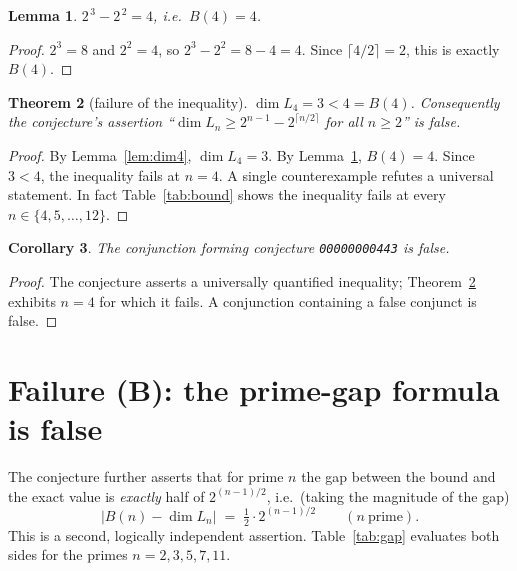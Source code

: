 \documentclass[11pt]{article}
\newtheorem{theorem}{Theorem}
\newtheorem{lemma}[theorem]{Lemma}
\newtheorem{corollary}[theorem]{Corollary}
\theoremstyle{definition}
\theoremstyle{remark}
\begin{document}
\begin{lemma}
\label{lem:b4}
$2^{\,3} - 2^{\,2} = 4$, i.e.\ $B(4) = 4$.
\end{lemma}

\begin{proof}
$2^{3} = 8$ and $2^{2} = 4$, so $2^{3} - 2^{2} = 8 - 4 = 4$. Since
$\lceil 4/2 \rceil = 2$, this is exactly $B(4)$.
\end{proof}

\begin{theorem}[failure of the inequality]
\label{thm:Afails}
$\dim L_4 = 3 < 4 = B(4)$. Consequently the conjecture's assertion
``$\dim L_n \ge 2^{n-1} - 2^{\lceil n/2\rceil}$ for all $n \ge 2$'' is false.
\end{theorem}

\begin{proof}
By Lemma~\ref{lem:dim4}, $\dim L_4 = 3$. By Lemma~\ref{lem:b4}, $B(4) = 4$.
Since $3 < 4$, the inequality fails at $n = 4$. A single counterexample refutes a
universal statement. In fact Table~\ref{tab:bound} shows the inequality fails at
every $n \in \{4,5,\dots,12\}$.
\end{proof}

\begin{corollary}
The conjunction forming conjecture \texttt{00000000443} is false.
\end{corollary}

\begin{proof}
The conjecture asserts a universally quantified inequality; Theorem~\ref{thm:Afails}
exhibits $n = 4$ for which it fails. A conjunction containing a false conjunct is
false.
\end{proof}

\section{Failure (B): the prime-gap formula is false}

The conjecture further asserts that for prime $n$ the gap between the bound and the
exact value is \emph{exactly} half of $2^{(n-1)/2}$, i.e.\ (taking the magnitude of
the gap)
\[
\bigl|B(n) - \dim L_n\bigr| \;=\; \tfrac12 \cdot 2^{(n-1)/2}
\qquad (n \ \text{prime}).
\]
This is a second, logically independent assertion. Table~\ref{tab:gap} evaluates
both sides for the primes $n = 2,3,5,7,11$.
\end{document}
